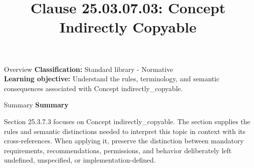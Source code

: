\documentclass[10pt,letterpaper]{article}
\title{Clause 25.03.07.03: Concept Indirectly Copyable}
\author{}
\date{}
\begin{document}
\maketitle
\begin{CornellOverviewBox}{Overview}
\textbf{Classification:} Standard library - Normative\\[2pt]
\textbf{Learning objective:} Understand the rules, terminology, and semantic consequences associated with Concept indirectly\_copyable.
\end{CornellOverviewBox}\begin{CornellSummaryBox}{Summary}
{\sffamily\bfseries\color{Accent} Summary}\par\vspace{3pt}Section 25.3.7.3 focuses on Concept indirectly\_copyable. The section supplies the rules and semantic distinctions needed to interpret this topic in context with its cross-references. When applying it, preserve the distinction between mandatory requirements, recommendations, permissions, and behavior deliberately left undefined, unspecified, or implementation-defined.
\end{CornellSummaryBox}
\end{document}
